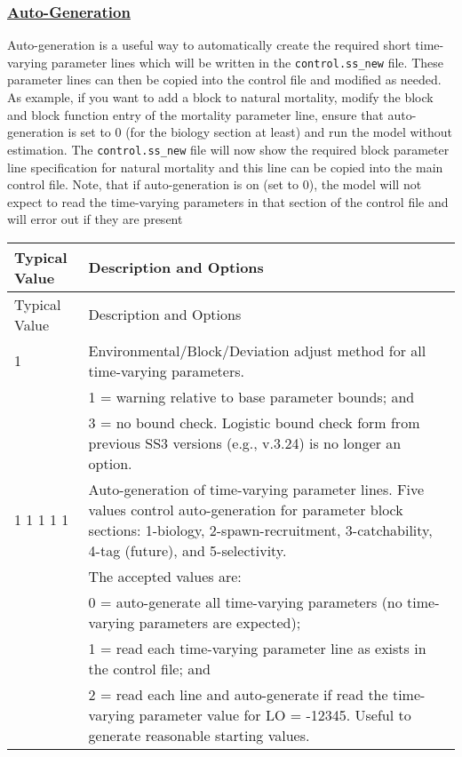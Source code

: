 \hypertarget{autogen}{}
\subsubsection[Auto-Generation]{\protect\hyperlink{autogen}{Auto-Generation}}
Auto-generation is a useful way to automatically create the required short time-varying parameter lines which will be written in the \texttt{control.ss\_new} file. These parameter lines can then be copied into the control file and modified as needed. As example, if you want to add a block to natural mortality, modify the block and block function entry of the mortality parameter line, ensure that auto-generation is set to 0 (for the biology section at least) and run the model without estimation. The \texttt{control.ss\_new} file will now show the required block parameter line specification for natural mortality and this line can be copied into the main control file. Note, that if auto-generation is on (set to 0), the model will not expect to read the time-varying parameters in that section of the control file and will error out if they are present

	
\begin{longtable}{p{0.5cm} p{2cm} p{12.5cm}}
	\hline
	\multicolumn{2}{l}{Typical Value} & Description and Options \Tstrut\Bstrut\\
	\hline
	\endfirsthead

	\hline
	\multicolumn{2}{l}{Typical Value} & Description and Options \Tstrut\Bstrut\\
	\hline
	\endhead

	\hline
	\endfoot

	\endlastfoot

	1 & & Environmental/Block/Deviation adjust method for all time-varying parameters. \Tstrut\\
	  & & 1 = warning relative to base parameter bounds; and \\
	  & & 3 = no bound check. Logistic bound check form from previous SS3 versions (e.g., v.3.24) is no longer an option. \Bstrut\\

	\multicolumn{2}{l}{1 1 1 1 1} & Auto-generation of time-varying parameter lines. Five values control auto-generation for parameter block sections: 1-biology, 2-spawn-recruitment, 3-catchability, 4-tag (future), and 5-selectivity. \\
	& 			& The accepted values are: \\
	& 			& 0 = auto-generate all time-varying parameters (no time-varying parameters are expected); \\
	& 			& 1 = read each time-varying parameter line as exists in the control file; and \\
	&			& 2 = read each line and auto-generate if read the time-varying parameter value for LO = -12345. Useful to generate reasonable starting values. \Bstrut\\
	\hline
\end{longtable}

